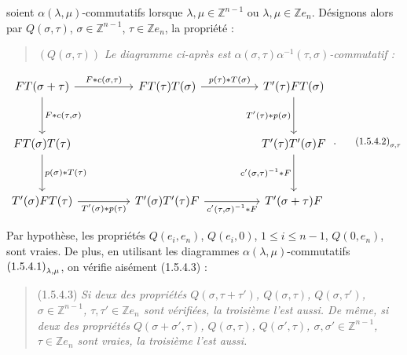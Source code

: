 %
soient $\alpha(\lambda,\mu)$-commutatifs lorsque
$\lambda,\mu\in\mathbb Z^{n-1}$ ou
$\lambda,\mu\in\mathbb Z e_n$. Désignons alors par
$Q(\sigma,\tau)$, $\sigma\in\mathbb Z^{n-1}$,
$\tau\in\mathbb Z e_n$, la propriété :

\begin{quote}
  \noindent\textup{$(Q(\sigma,\tau))$}\quad
  \emph{Le diagramme ci-après est
  $\alpha(\sigma,\tau)\alpha^{-1}(\tau,\sigma)$-commutatif :}
\end{quote}

\begin{equation}
  \resizebox{0.98\textwidth}{!}{%
    $\begin{tikzcd}[ampersand replacement=\&,column sep=4.5em,row sep=3.2em]
      FT(\sigma+\tau)
        \arrow[r,"{F*c(\sigma,\tau)}"]
        \arrow[d,"{F*c(\tau,\sigma)}"]
        \& FT(\tau)T(\sigma)
        \arrow[r,"{p(\tau)*T(\sigma)}"]
        \& T'(\tau)FT(\sigma)
        \arrow[d,"{T'(\tau)*p(\sigma)}"'] \\
      FT(\sigma)T(\tau)
        \arrow[d,"{p(\sigma)*T(\tau)}"]
        \& {}
        \& T'(\tau)T'(\sigma)F
        \arrow[d,"{c'(\sigma,\tau)^{-1}*F}"'] \\
      T'(\sigma)FT(\tau)
        \arrow[r,"{T'(\sigma)*p(\tau)}"']
        \& T'(\sigma)T'(\tau)F
        \arrow[r,"{c'(\tau,\sigma)^{-1}*F}"']
        \& T'(\sigma+\tau)F
    \end{tikzcd}$%
  }\;.
  \tag*{\(\textup{(1.5.4.2)}_{\sigma,\tau}\)}
\end{equation}

Par hypothèse, les propriétés
$Q(e_i,e_n)$, $Q(e_i,0)$, $1\leq i\leq n-1$, $Q(0,e_n)$,
sont vraies. De plus, en utilisant les diagrammes
$\alpha(\lambda,\mu)$-commutatifs
$\textup{(1.5.4.1)}_{\lambda,\mu}$, on vérifie aisément
(1.5.4.3) :

\begin{quote}
  \noindent\textup{(1.5.4.3)}\quad
  \emph{Si deux des propriétés
  $Q(\sigma,\tau+\tau')$, $Q(\sigma,\tau)$, $Q(\sigma,\tau')$,
  $\sigma\in\mathbb Z^{n-1}$, $\tau,\tau'\in\mathbb Z e_n$
  sont vérifiées, la troisième l'est aussi. De même, si deux des
  propriétés $Q(\sigma+\sigma',\tau)$, $Q(\sigma,\tau)$,
  $Q(\sigma',\tau)$, $\sigma,\sigma'\in\mathbb Z^{n-1}$,
  $\tau\in\mathbb Z e_n$ sont vraies, la troisième l'est aussi.}
\end{quote}

